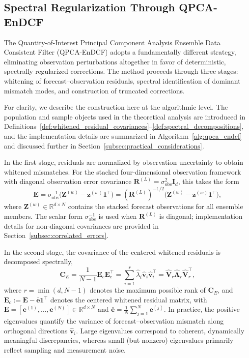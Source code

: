 \documentclass[11pt,a4paper]{article}
\begin{document}
\subsection{Spectral Regularization Through QPCA-EnDCF}

The Quantity-of-Interest Principal Component Analysis Ensemble Data Consistent Filter (QPCA-EnDCF) adopts a fundamentally different strategy, eliminating observation perturbations altogether in favor of deterministic, spectrally regularized corrections. The method proceeds through three stages: whitening of forecast--observation residuals, spectral identification of dominant mismatch modes, and construction of truncated corrections.

For clarity, we describe the construction here at the algorithmic level. The population and sample objects used in the theoretical analysis are introduced in Definitions~\ref{def:whitened_residual_covariances}--\ref{def:spectral_decompositions}, and the implementation details are summarized in Algorithm~\ref{alg:qpca_endcf} and discussed further in Section~\ref{subsec:practical_considerations}.

In the first stage, residuals are normalized by observation uncertainty to obtain whitened mismatches. For the stacked four-dimensional observation framework with diagonal observation error covariance $\mathbf{R}^{(L)}=\sigma_{\mathrm{obs}}^2\mathbf{I}_{d}$, this takes the form
\begin{equation}
\mathbf{E}
=
\sigma_{\mathrm{obs}}^{-1}
\bigl(\mathbf{Z}^{(w)}-\mathbf{z}^{(w)}\mathbf{1}^\top\bigr)
=
(\mathbf{R}^{(L)})^{-1/2}
\bigl(\mathbf{Z}^{(w)}-\mathbf{z}^{(w)}\mathbf{1}^\top\bigr),
\label{eq:whitening_problem}
\end{equation}
where $\mathbf{Z}^{(w)}\in\mathbb{R}^{d\times N}$ contains the stacked forecast observations for all ensemble members. The scalar form $\sigma_{\mathrm{obs}}^{-1}$ is used when $\mathbf{R}^{(L)}$ is diagonal; implementation details for non-diagonal covariances are provided in Section~\ref{subsec:correlated_errors}.

In the second stage, the covariance of the centered whitened residuals is decomposed spectrally,
\begin{equation}
\mathbf{C}_E
=
\frac{1}{N-1}\mathbf{E}_c\mathbf{E}_c^\top
=
\sum_{i=1}^{r}\hat{\lambda}_i\hat{\mathbf{v}}_i\hat{\mathbf{v}}_i^\top = \hat{\mathbf{V}}_r \hat{\boldsymbol{\Lambda}}_r \hat{\mathbf{V}}_r^\top,
\label{eq:spectral_decomp_problem}
\end{equation}
where $r=\min(d,N-1)$ denotes the maximum possible rank of $\mathbf{C}_E$, and $\mathbf{E}_c:=\mathbf{E}-\bar{\mathbf{e}}\mathbf{1}^\top$ denotes the centered whitened residual matrix, with $\mathbf{E}=[\mathbf{e}^{(1)},\ldots,\mathbf{e}^{(N)}]\in\mathbb{R}^{d\times N}$ and $\bar{\mathbf{e}}=\frac{1}{N}\sum_{j=1}^N\mathbf{e}^{(j)}$. 
In practice, the positive eigenvalues quantify the variance of forecast--observation mismatch along orthogonal directions $\hat{\mathbf{v}}_i$. Large eigenvalues correspond to coherent, dynamically meaningful discrepancies, whereas small (but nonzero) eigenvalues primarily reflect sampling and measurement noise.
\end{document}
